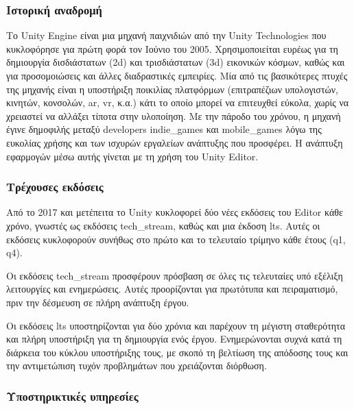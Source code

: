 \subsubsection{Ιστορική αναδρομή}

Το Unity Engine\cite{noauthor_real-time_nodate} είναι μια μηχανή παιχνιδιών από την Unity Technologies που κυκλοφόρησε για πρώτη φορά τον Ιούνιο του 2005. Χρησιμοποιείται ευρέως για τη δημιουργία δισδιάστατων (\acrshort{2d}) και τρισδιάστατων (\acrshort{3d}) εικονικών κόσμων, καθώς και για προσομοιώσεις και άλλες διαδραστικές εμπειρίες. Μία από τις βασικότερες πτυχές της μηχανής είναι η υποστήριξη ποικιλίας πλατφόρμων (επιτραπέζιων υπολογιστών, κινητών, κονσολών, \acrshort{ar}, \acrshort{vr}, κ.α.) κάτι το οποίο μπορεί να επιτευχθεί εύκολα, χωρίς να χρειαστεί να αλλάξει τίποτα στην υλοποίηση. Με την πάροδο του χρόνου, η μηχανή έγινε δημοφιλής μεταξύ \glspl{developer} \glspl{indie_game} και \glspl{mobile_game} λόγω της ευκολίας χρήσης και των ισχυρών εργαλείων ανάπτυξης που προσφέρει. Η ανάπτυξη εφαρμογών μέσω αυτής γίνεται με τη χρήση του Unity Editor\cite{noauthor_unity_2024,haas_history_2014}.

\subsubsection{Τρέχουσες εκδόσεις}

Από το 2017 και μετέπειτα\cite{noauthor_unity_nodate} το Unity κυκλοφορεί δύο νέες εκδόσεις του Editor κάθε χρόνο, γνωστές ως εκδόσεις \gls{tech_stream}, καθώς και μια έκδοση \acrshort{lts}. Αυτές οι εκδόσεις κυκλοφορούν συνήθως στο πρώτο και το τελευταίο τρίμηνο κάθε έτους (\gls{q1}, \gls{q4}).

Οι εκδόσεις \gls{tech_stream} προσφέρουν πρόσβαση σε όλες τις τελευταίες υπό εξέλιξη λειτουργίες και ενημερώσεις. Αυτές προορίζονται για πρωτότυπα και πειραματισμό, πριν την δέσμευση σε πλήρη ανάπτυξη έργου.

Οι εκδόσεις \acrshort{lts} υποστηρίζονται για δύο χρόνια και παρέχουν τη μέγιστη σταθερότητα και πλήρη υποστήριξη για τη δημιουργία ενός έργου. Ενημερώνονται συχνά κατά τη διάρκεια του κύκλου υποστήριξης τους, με σκοπό τη βελτίωση της απόδοσης τους και την αντιμετώπιση τυχόν προβλημάτων που χρειάζονται διόρθωση\cite{technologies_lts_nodate}.

\subsubsection{Υποστηρικτικές υπηρεσίες}

